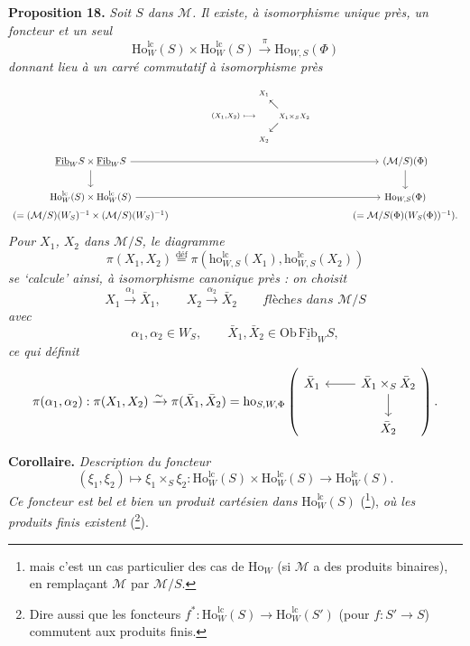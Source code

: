 \documentclass[11pt]{article}
\newcommand{\printedpage}[1]{\marginpar{\footnotesize p.~#1}}
\newcommand{\msp}[1]{\marginpar{\footnotesize [#1]}}
\newcommand{\Fibu}{\underline{\mathrm{Fib}}}
\newcommand{\Ho}{\mathrm{Ho}}
\newcommand{\ho}{\mathrm{ho}}
\newcommand{\lc}{\mathrm{lc}}
\begin{document}
\textbf{Proposition 18.} \textit{Soit $S$ dans $\mathcal{M}$. Il existe, à isomorphisme unique près, un foncteur et un seul}
\[
\Ho^{\lc}_W(S) \times \Ho^{\lc}_W(S) \xrightarrow{\pi} \Ho_{W,S}(\Phi)
\]
\textit{donnant lieu à un carré commutatif à isomorphisme près}
\[
\begin{tikzcd}[ampersand replacement=\&, column sep=large]
 \& {\scriptstyle (X_1,X_2)\ \longmapsto\ \begin{array}{@{}c@{}c@{}c@{}} \scriptstyle X_1 & & \\ & \nwarrow & \\ & & \scriptstyle X_1 \times_S X_2 \\ & \swarrow & \\ \scriptstyle X_2 & & \end{array}} \& \\[-3ex]
\Fibu_W S \times \Fibu_W S \arrow[rr] \arrow[d] \& \& (\mathcal{M}/S)(\Phi) \arrow[d] \\
\Ho^{\lc}_W(S) \times \Ho^{\lc}_W(S) \arrow[rr] \& \& \Ho_{W,S}(\Phi) \\[-4ex]
(= (\mathcal{M}/S)(W_S)^{-1} \times (\mathcal{M}/S)(W_S)^{-1}) \& \& (= \mathcal{M}/S(\Phi)(W_S(\Phi))^{-1}).
\end{tikzcd}
\]
\textit{Pour $X_1$, $X_2$ dans $\mathcal{M}/S$, le diagramme}
\[
\pi(X_1, X_2) \overset{\text{déf}}{=} \pi(\ho^{\lc}_{W,S}(X_1), \ho^{\lc}_{W,S}(X_2))
\]
\textit{se `calcule' ainsi, à isomorphisme canonique près : on choisit}
\[
X_1 \xrightarrow{\alpha_1} \bar{X}_1, \qquad X_2 \xrightarrow{\alpha_2} \bar{X}_2 \qquad \textit{flèches dans } \mathcal{M}/S
\]
\textit{avec}
\[
\alpha_1, \alpha_2 \in W_S, \qquad \bar{X}_1, \bar{X}_2 \in \mathrm{Ob}\, \Fibu_W S,
\]
\textit{ce qui définit}
\[
\pi(\alpha_1, \alpha_2) : \pi(X_1, X_2) \xrightarrow{\sim} \pi(\bar{X}_1, \bar{X}_2) = \ho_{S,W,\Phi}
\left(
\begin{tikzcd}[ampersand replacement=\&]
\bar{X}_1 \& \bar{X}_1 \times_S \bar{X}_2 \arrow[l] \arrow[d] \\
 \& \bar{X}_2
\end{tikzcd}
\right).
\]

\setcounter{footnote}{131}

\printedpage{160}

\msp{page 247}

\textbf{Corollaire.} {\itshape Description du foncteur
\[
(\xi_1,\xi_2)\longmapsto\xi_1\times_S\xi_2 : \Ho^{\lc}_W(S)\times\Ho^{\lc}_W(S)\longrightarrow\Ho^{\lc}_W(S).
\]
Ce foncteur est bel et bien un produit cartésien dans} $\Ho^{\lc}_W(S)$ (\footnote{mais c'est un cas particulier des cas de $\Ho_W$ (si $\mathcal{M}$ a des produits binaires), en remplaçant $\mathcal{M}$ par $\mathcal{M}/S$.}), {\itshape où les produits finis existent} (\footnote{Dire aussi que les foncteurs $f^* : \Ho^{\lc}_W(S)\longrightarrow\Ho^{\lc}_W(S')$ (pour $f : S'\longrightarrow S$) commutent aux produits finis.}).
\end{document}
